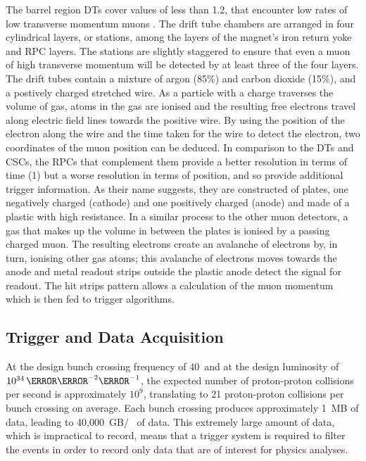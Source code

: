 The barrel region DTs cover \abseta values of less than 1.2, that encounter low rates of low transverse
momentum muons \cite{CMS_TDR1}. The drift tube chambers are arranged in four cylindrical layers, or stations,
among the layers of the magnet's iron return yoke and RPC layers. The stations are slightly staggered to
ensure that even a muon of high transverse momentum will be detected by at least three of the four layers. The
drift tubes contain a mixture of argon (85\%) and carbon dioxide (15\%), and a postively charged stretched
wire. As a particle with a charge traverses the volume of gas, atoms in the gas are ionised and the resulting
free electrons travel along electric field lines towards the positive wire. By using the position of the
electron along the wire and the time taken for the wire to detect the electron, two coordinates of the muon
position can be deduced.
In comparison to the DTs and CSCs, the RPCs that complement them provide a better resolution in terms of time
(1\ns) but a worse resolution in terms of position, and so provide additional trigger information. As their
name suggests, they are constructed of plates, one negatively charged (cathode) and one positively charged
(anode) and made of a plastic with high resistance. In a similar process to the other muon detectors, a gas
that makes up the volume in between the plates is ionised by a passing charged muon. The resulting electrons
create an avalanche of electrons by, in turn, ionising other gas atoms; this avalanche of electrons moves
towards the anode and metal readout strips outside the plastic anode detect the signal for readout. The hit
strips pattern allows a calculation of the muon momentum which is then fed to trigger algorithms.

\subsection{Trigger and Data Acquisition}
\label{ss:Trigger}
At the design bunch crossing frequency of 40~\MHz and at the design luminosity of $10^{34}\cm^{-2}\s^{-1}$,
the expected number of proton-proton collisions per second is approximately $10^{9}$, translating to 21
proton-proton collisions per bunch crossing on average. Each bunch crossing produces approximately 1~MB of
data, leading to 40,000~GB/\s~ of data. This extremely large amount of data, which is impractical to record,
means that a trigger system is required to filter the events in order to record only data that are of interest
for physics analyses.

